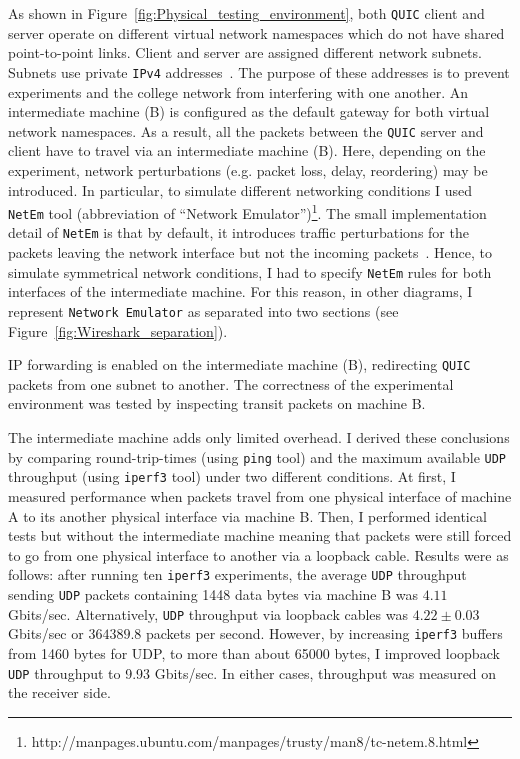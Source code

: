 \documentclass[12pt,a4paper,twoside,openright]{report}
\begin{document}
    As shown in Figure~\ref{fig:Physical_testing_environment}, both \texttt{QUIC} client and server operate on different virtual network namespaces which do not have shared point-to-point links.
    Client and server are assigned different network subnets.
    Subnets use private \texttt{IPv4} addresses~\cite{rfc1918}.
    The purpose of these addresses is to prevent experiments and the college network from interfering with one another.
    An intermediate machine (B) is configured as the default gateway for both virtual network namespaces.
    As a result, all the packets between the \texttt{QUIC} server and client have to travel via an intermediate machine (B).
    Here, depending on the experiment, network perturbations (e.g. packet loss, delay, reordering) may be introduced.
    In particular, to simulate different networking conditions I used \texttt{NetEm} tool (abbreviation of \enquote{Network Emulator})\footnote{http://manpages.ubuntu.com/manpages/trusty/man8/tc-netem.8.html}.
    The small implementation detail of \texttt{NetEm} is that by default, it introduces traffic perturbations for the packets leaving the network interface but not the incoming packets~\cite{Ubuntu_Manpage_NetEm}.
    Hence, to simulate symmetrical network conditions, I had to specify \texttt{NetEm} rules for both interfaces of the intermediate machine.
    For this reason, in other diagrams, I represent \texttt{Network Emulator} as separated into two sections (see Figure~\ref{fig:Wireshark_separation}).
    
    
    IP forwarding is enabled on the intermediate machine (B), redirecting \texttt{QUIC} packets from one subnet to another.
    The correctness of the experimental environment was tested by inspecting transit packets on machine B.



    The intermediate machine adds only limited overhead.
    I derived these conclusions by comparing round-trip-times (using \texttt{ping} tool) and the maximum available \texttt{UDP} throughput (using \texttt{iperf3} tool) under two different conditions.
    At first, I measured performance when packets travel from one physical interface of machine A to its another physical interface via machine B.
    Then, I performed identical tests but without the intermediate machine meaning that packets were still forced to go from one physical interface to another via a loopback cable.
    Results were as follows: after running ten \texttt{iperf3} experiments, the average \texttt{UDP} throughput sending \texttt{UDP} packets containing 1448 data bytes via machine B was $4.11$ Gbits/sec.
    Alternatively, \texttt{UDP} throughput via loopback cables was $4.22 \pm 0.03$ Gbits/sec or $364389.8$ packets per second.
    However, by increasing \texttt{iperf3} buffers from 1460 bytes for UDP, to more than about 65000 bytes, I improved loopback \texttt{UDP} throughput to 9.93 Gbits/sec.
    In either cases, throughput was measured on the receiver side.
    
\end{document}

